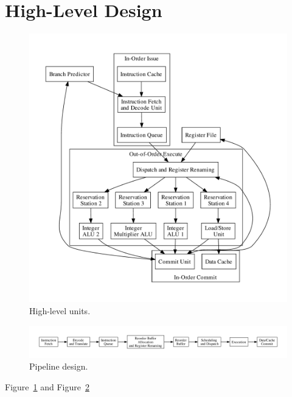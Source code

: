 \documentclass[12pt]{article}
\begin{document}
    \section{High-Level Design}
    
    \begin{figure}[ht]
      \centering
        \includegraphics[width=\textwidth]{figures/design.pdf}
        \caption{High-level units.\label{fig:design}}
    \end{figure}
    
    \begin{figure}[ht]
      \centering
        \includegraphics[width=\textwidth]{figures/pipeline.pdf}
        \caption{Pipeline design. \label{fig:pipeline}}
    \end{figure}
    
    Figure~\ref{fig:design} and Figure~\ref{fig:pipeline}
	
\end{document}
